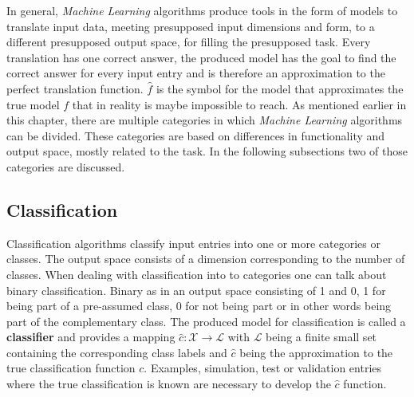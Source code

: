 In general, \textit{Machine Learning} algorithms produce tools in the form of models to translate input data, meeting presupposed input dimensions and form, to a different presupposed output space, for filling the presupposed task.
Every translation has one correct answer, the produced model has the goal to find the correct answer for every input entry and is therefore an approximation to the perfect translation function.
$\hat{f}$ is the symbol for the model that approximates the true model $ f$ that in reality is maybe impossible to reach.
As mentioned earlier in this chapter, there are multiple categories in which \textit{Machine Learning} algorithms can be divided.
These categories are based on differences in functionality and output space, mostly related to the task.
In the following subsections two of those categories are discussed.

\subsection{Classification}
Classification algorithms classify input entries into one or more categories or classes.
The output space consists of a dimension corresponding to the number of classes.
When dealing with classification into to categories one can talk about binary classification.
Binary as in an output space consisting of 1 and 0, 1 for being part of a pre-assumed class, 0 for not being part or in other words being part of the complementary class.
The produced model for classification is called a \textbf{classifier} and provides a mapping $\hat{c}: \mathscr{X} \to \mathscr{L}$ with $\mathscr{L}$ being a finite small set containing the corresponding class labels and $\hat{c}$ being the approximation to the true classification function $ c$.
Examples, simulation, test or validation entries where the true classification is known are necessary to develop the $\hat{c}$ function.

